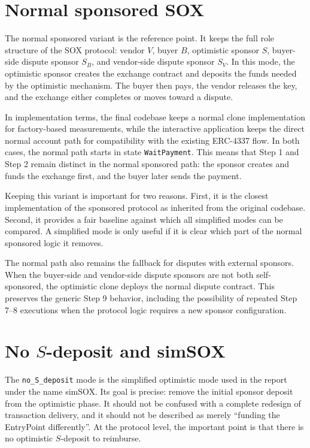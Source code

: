 \section{Normal sponsored SOX}

The normal sponsored variant is the reference point. It keeps the full role structure of the
SOX protocol: vendor \(V\), buyer \(B\), optimistic sponsor \(S\), buyer-side dispute sponsor
\(S_B\), and vendor-side dispute sponsor \(S_V\). In this mode, the optimistic sponsor creates
the exchange contract and deposits the funds needed by the optimistic mechanism. The buyer
then pays, the vendor releases the key, and the exchange either completes or moves toward a
dispute.

In implementation terms, the final codebase keeps a normal clone implementation for
factory-based measurements, while the interactive application keeps the direct normal
account path for compatibility with the existing ERC-4337 flow. In both cases, the normal
path starts in state \texttt{WaitPayment}. This means that Step 1 and Step 2 remain distinct
in the normal sponsored path: the sponsor creates and funds the exchange first, and the
buyer later sends the payment.

Keeping this variant is important for two reasons. First, it is the closest implementation
of the sponsored protocol as inherited from the original codebase. Second, it provides a
fair baseline against which all simplified modes can be compared. A simplified mode is only
useful if it is clear which part of the normal sponsored logic it removes.

The normal path also remains the fallback for disputes with external sponsors. When the
buyer-side and vendor-side dispute sponsors are not both self-sponsored, the optimistic clone
deploys the normal dispute contract. This preserves the generic Step 9 behavior, including
the possibility of repeated Step 7--8 executions when the protocol logic requires a new
sponsor configuration.

\section[No S-deposit and simSOX]{No \(S\)-deposit and simSOX}

The \texttt{no\_S\_deposit} mode is the simplified optimistic mode used in the report under
the name simSOX. Its goal is precise: remove the initial sponsor deposit from the optimistic
phase. It should not be confused with a complete redesign of transaction delivery, and it
should not be described as merely ``funding the EntryPoint differently''. At the protocol
level, the important point is that there is no optimistic \(S\)-deposit to reimburse.

